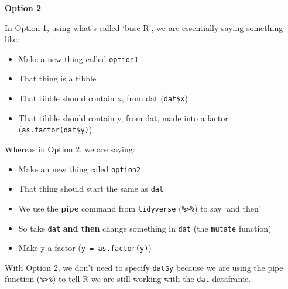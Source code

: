 \documentclass[
]{book}
\newenvironment{Shaded}{\begin{snugshade}}{\end{snugshade}}
\newcommand{\DataTypeTok}[1]{\textcolor[rgb]{0.13,0.29,0.53}{#1}}
\newcommand{\KeywordTok}[1]{\textcolor[rgb]{0.13,0.29,0.53}{\textbf{#1}}}
\newcommand{\NormalTok}[1]{#1}
\newcommand{\OperatorTok}[1]{\textcolor[rgb]{0.81,0.36,0.00}{\textbf{#1}}}
\newcommand{\StringTok}[1]{\textcolor[rgb]{0.31,0.60,0.02}{#1}}
\begin{document}
\begin{Shaded}
\end{Shaded}

\textbf{Option 2}

\begin{Shaded}
\end{Shaded}

In Option 1, using what's called `base R', we are essentially saying something like:

\begin{itemize}
\item
  Make a new thing called \texttt{option1}
\item
  That thing is a tibble
\item
  That tibble should contain x, from dat (\texttt{dat\$x})
\item
  That tibble should contain y, from dat, made into a factor (\texttt{as.factor(dat\$y)})
\end{itemize}

Whereas in Option 2, we are saying:

\begin{itemize}
\item
  Make an new thing caled \texttt{option2}
\item
  That thing should start the same as \texttt{dat}
\item
  We use the \textbf{pipe} command from \texttt{tidyverse} (\texttt{\%\textgreater{}\%}) to say `and then'
\item
  So take \texttt{dat} \textbf{and then} change something in \texttt{dat} (the \texttt{mutate} function)
\item
  Make y a factor (\texttt{y\ =\ as.factor(y)})
\end{itemize}

With Option 2, we don't need to specify \texttt{dat\$y} because we are using the pipe function (\texttt{\%\textgreater{}\%}) to tell R we are still working with the \texttt{dat} dataframe.
\end{document}
